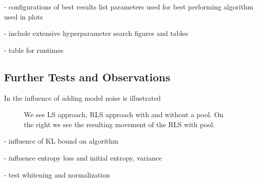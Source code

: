- configurations of best results list parameters used
for best performing algorithm used in plots

- include extensive hyperparameter search figures and tables

- table for runtimes

\subsection{Further Tests and Observations}
In  the influence of adding model noise is
illustrated

 \begin{figure}[ht!]
  \centering
     
     \hspace{1cm}                       
     \caption{
       We see LS approach, RLS approach with and without a pool.
       On the right we see the resulting movement of the RLS with pool.
     }
     \label{fig:noise_weighting}  
\end{figure}

- influence of KL bound on algorithm

- influence entropy loss and initial entropy, variance

- test whitening and normalization


